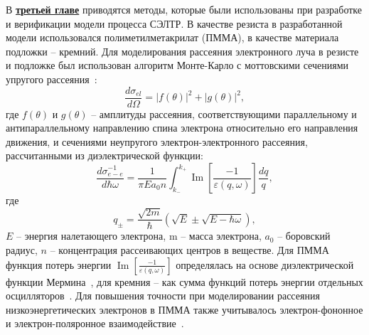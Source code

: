 В \underline{\textbf{третьей главе}} приводятся методы, которые были использованы при разработке и верификации модели процесса СЭЛТР. В качестве резиста в разработанной модели использовался полиметилметакрилат (ПММА), в качестве материала подложки -- кремний. Для моделирования рассеяния электронного луча в резисте и подложке был использован алгоритм Монте-Карло с моттовскими сечениями упругого рассеяния~\cite{Czyzewski_mott_cs}:
\begin{equation}
	\frac{d \sigma_{e l}}{d \Omega}=|f(\theta)|^2+|g(\theta)|^2,
\end{equation}
где $f(\theta)$ и $g(\theta)$ -- амплитуды рассеяния, соответствующими параллельному и антипараллельному направлению спина электрона относительно его направления движения, и сечениями неупругого электрон-электронного рассеяния, рассчитанными из диэлектрической функции:
\begin{equation}
	\frac{d \sigma_{e-e}^{-1}}{d \hbar \omega}=\frac{1}{\pi E a_0 n} \int_{k_{-}}^{k_{+}} \operatorname{Im}\left[\frac{-1}{\varepsilon(q, \omega)}\right] \frac{d q}{q},
\end{equation}
где
\begin{equation}
	q_{\pm}=\frac{\sqrt{2 m}}{\hbar}(\sqrt{E} \pm \sqrt{E-\hbar \omega}),
\end{equation}
$E$ -- энергия налетающего электрона, m -- масса электрона, $a_0$ -- боровский радиус, $n$ -- концентрация рассеивающих центров в веществе. Для ПММА функция потерь энергии $\operatorname{Im}\left[\frac{-1}{\varepsilon(q, \omega)}\right]$ определялась на основе диэлектрической функции Мермина~\cite{Mermin}, для кремния -- как сумма функций потерь энергии отдельных осцилляторов~\cite{Valentin2012_Si}. Для повышения точности при моделировании рассеяния низкоэнергетических электронов в ПММА также учитывалось электрон-фононное и электрон-поляронное взаимодействие~\cite{Ciappa_2010}.


